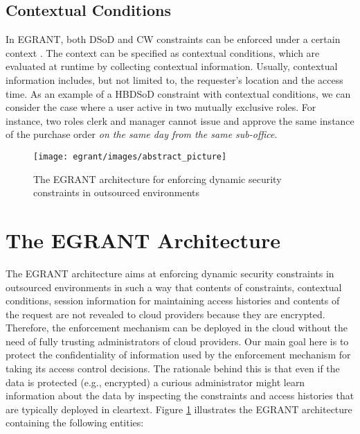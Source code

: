 \documentclass[epsfig,a4paper,11pt,titlepage]{book}
\numberwithin{algorithm}{chapter}
\begin{document}
\subsection{Contextual Conditions}
In \gls{EGRANT}, both \gls{DSoD} and \gls{CW} constraints can be enforced under a certain context \cite{Asghar2013-COSE, Asghar2011-ARES, Joshi:2008, Kim:2007, Joshi:2005, Strembeck:2004}. The context can be specified as contextual conditions, which are evaluated at runtime by collecting contextual information. Usually, contextual information includes, but not limited to, the requester's location and the access time. As an example of a \gls{HBDSoD} constraint with contextual conditions, we can consider the case where a user active in two mutually exclusive roles. For instance, two roles clerk and manager cannot issue and approve the same instance of the purchase order \emph{on the same day from the same sub-office}.

\begin{figure} [htp]
\centering
\texttt{[image: egrant/images/abstract\_picture]}
\caption[The E-GRANT architecture for enforcing dynamic security constraints]{The \gls{EGRANT} architecture for enforcing dynamic security constraints in outsourced environments}
\label{fig:egrant-abstract_picture}
\end{figure}

\section[The E-GRANT Architecture]{The \acrshort{EGRANT} Architecture}
\label{sec:egrant-architecture}
The \gls{EGRANT} architecture aims at enforcing dynamic security constraints in outsourced environments in such a way that contents of constraints, contextual conditions, session information for maintaining access histories and contents of the request are not revealed to cloud providers because they are encrypted. Therefore, the enforcement mechanism can be deployed in the cloud without the need of fully trusting administrators of cloud providers. Our main goal here is to protect the confidentiality of information used by the enforcement mechanism for taking its access control decisions. The rationale behind this is that even if the data is protected (e.g., encrypted) a curious administrator might learn information about the data by inspecting the constraints and access histories that are typically deployed in cleartext. Figure \ref{fig:egrant-abstract_picture} illustrates the \gls{EGRANT} architecture containing the following entities:
\end{document}
